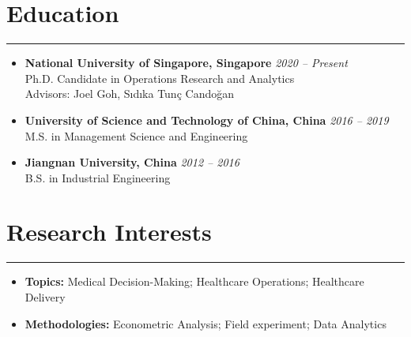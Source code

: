 \documentclass[12pt, a4paper]{article}
\begin{document}
{\small

\section*{Education}
\vspace*{4pt}
\hrule

\begin{itemize}[leftmargin=16pt]

	\item[]
	\textbf{National University of Singapore, Singapore} \hfill \textit{2020 -- Present} \\
	Ph.D. Candidate in Operations Research and Analytics \\
	Advisors: Joel Goh, S\i{}d\i{}ka Tun\c{c} Cando\u{g}an

	\item[]
	\textbf{University of Science and Technology of China, China} \hfill \textit{2016 -- 2019} \\
	M.S. in Management Science and Engineering

	\item[]
	\textbf{Jiangnan University, China} \hfill \textit{2012 -- 2016} \\
	B.S. in Industrial Engineering

\end{itemize}




\section*{Research Interests}
\vspace*{4pt}
\hrule

\begin{itemize}[leftmargin=16pt, itemsep=2pt]

	\item[] \textbf{Topics:} Medical Decision-Making; Healthcare Operations; Healthcare Delivery
	\item[] \textbf{Methodologies:} Econometric Analysis; Field experiment; Data Analytics
	

\end{itemize}}
\end{document}
